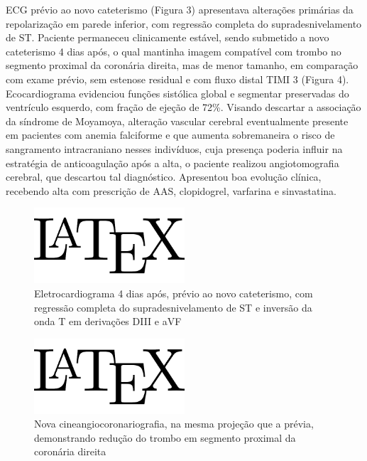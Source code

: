 \par ECG prévio ao novo cateterismo (Figura 3) apresentava alterações primárias da repolarização em parede inferior, com regressão completa do supradesnivelamento de ST. Paciente permaneceu clinicamente estável, sendo submetido a novo cateterismo 4 dias após, o qual mantinha imagem compatível com trombo no segmento proximal da coronária direita, mas de menor tamanho, em comparação com exame prévio, sem estenose residual e com fluxo distal TIMI 3 (Figura 4). Ecocardiograma evidenciou funções sistólica global e segmentar preservadas do ventrículo esquerdo, com fração de ejeção de 72\%. Visando descartar a associação da síndrome de Moyamoya, alteração vascular cerebral eventualmente presente em pacientes com anemia falciforme e que aumenta sobremaneira o risco de sangramento intracraniano nesses indivíduos, cuja presença poderia influir na estratégia de anticoagulação após a alta, o paciente realizou angiotomografia cerebral, que descartou tal diagnóstico. Apresentou boa evolução clínica, recebendo alta com prescrição de AAS, clopidogrel, varfarina e sinvastatina.
\begin{figure}[p]
	\centering
	\includegraphics[width=0.5\textwidth]{temp.png}
	\caption{Eletrocardiograma 4 dias após, prévio ao novo cateterismo, com regressão completa do supradesnivelamento de ST e inversão da onda T em derivações DIII e aVF}
	\label{Figura 3}
\end{figure}


\begin{figure}[p]
	\centering
	\includegraphics[width=0.5\textwidth]{temp.png}
	\caption{Nova cineangiocoronariografia, na mesma projeção que a prévia, demonstrando redução do trombo em segmento proximal da coronária direita}
	\label{Figura 4}
\end{figure}

